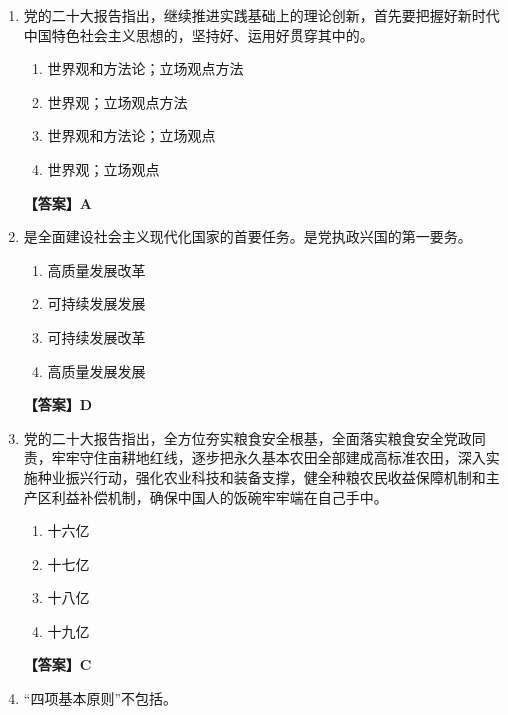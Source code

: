 \documentclass[UTF8,11pt,a4paper]{ctexart}
\begin{document}
\begin{enumerate}[label=\textbf{\arabic*.}, leftmargin=2.5em, itemsep=0.7em]
\begin{enumerate}[label=\Alph*., leftmargin=2em, itemsep=0.1em, topsep=0.15em]
\item 中国化时代化
\item 时代化理论化
\item 理论化现代化
\item 中国化现代化
\end{enumerate}
\textbf{【答案】A}
\item 党的二十大报告指出，继续推进实践基础上的理论创新，首先要把握好新时代中国特色社会主义思想的\allowbreak\underline{\hspace{4em}}，坚持好、运用好贯穿其中的\allowbreak\underline{\hspace{4em}}。
\begin{enumerate}[label=\Alph*., leftmargin=2em, itemsep=0.1em, topsep=0.15em]
\item 世界观和方法论；立场观点方法
\item 世界观；立场观点方法
\item 世界观和方法论；立场观点
\item 世界观；立场观点
\end{enumerate}
\textbf{【答案】A}
\item \allowbreak\underline{\hspace{4em}}是全面建设社会主义现代化国家的首要任务。\allowbreak\underline{\hspace{4em}}是党执政兴国的第一要务。
\begin{enumerate}[label=\Alph*., leftmargin=2em, itemsep=0.1em, topsep=0.15em]
\item 高质量发展改革
\item 可持续发展发展
\item 可持续发展改革
\item 高质量发展发展
\end{enumerate}
\textbf{【答案】D}
\item 党的二十大报告指出，全方位夯实粮食安全根基，全面落实粮食安全党政同责，牢牢守住\allowbreak\underline{\hspace{4em}}亩耕地红线，逐步把永久基本农田全部建成高标准农田，深入实施种业振兴行动，强化农业科技和装备支撑，健全种粮农民收益保障机制和主产区利益补偿机制，确保中国人的饭碗牢牢端在自己手中。
\begin{enumerate}[label=\Alph*., leftmargin=2em, itemsep=0.1em, topsep=0.15em]
\item 十六亿
\item 十七亿
\item 十八亿
\item 十九亿
\end{enumerate}
\textbf{【答案】C}
\item “四项基本原则”不包括\allowbreak\underline{\hspace{4em}}。

\end{enumerate}
\end{document}
